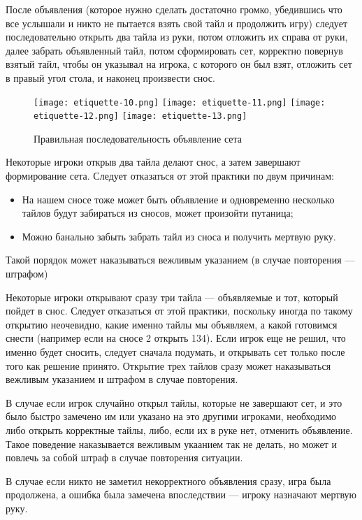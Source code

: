 После объявления (которое нужно сделать достаточно громко, убедившись что все услышали и никто не пытается взять свой тайл и продолжить игру) следует последовательно открыть два тайла из руки, потом отложить их справа от руки, далее забрать объявленный тайл, потом сформировать сет, корректно повернув взятый тайл, чтобы он указывал на игрока, с которого он был взят, отложить сет в правый угол стола, и наконец произвести снос.

\begin{figure}[H]
	\centering
	\texttt{[image: etiquette-10.png]}
	\texttt{[image: etiquette-11.png]}
	\texttt{[image: etiquette-12.png]}
	\texttt{[image: etiquette-13.png]}
	\caption{Правильная последовательность объявление сета}
\end{figure}

Некоторые игроки открыв два тайла делают снос, а затем завершают формирование сета. Следует отказаться от этой практики по двум причинам:
\begin{itemize}
	\item На нашем сносе тоже может быть объявление и одновременно несколько тайлов будут забираться из сносов, может произойти путаница;
	\item Можно банально забыть забрать тайл из сноса и получить мертвую руку.
\end{itemize}

Такой порядок может наказываться вежливым указанием (в случае повторения --- штрафом)

Некоторые игроки открывают сразу три тайла --- объявляемые и тот, который пойдет в снос. Следует отказаться от этой практики, поскольку иногда по такому открытию неочевидно, какие именно тайлы мы объявляем, а какой готовимся снести (например если на сносе 2 открыть 134). Если игрок еще не решил, что именно будет сносить, следует сначала подумать, и открывать сет только после того как решение принято. Открытие трех тайлов сразу может наказываться вежливым указанием и штрафом в случае повторения.

В случае если игрок случайно открыл тайлы, которые не завершают сет, и это было быстро замечено им или указано на это другими игроками, необходимо либо открыть корректные тайлы, либо, если их в руке нет, отменить объявление. Такое поведение наказывается вежливым укаанием так не делать, но может и повлечь за собой штраф в случае повторения ситуации.

В случае если никто не заметил некорректного объявления сразу, игра была продолжена, а ошибка была замечена впоследствии --- игроку назначают мертвую руку.

